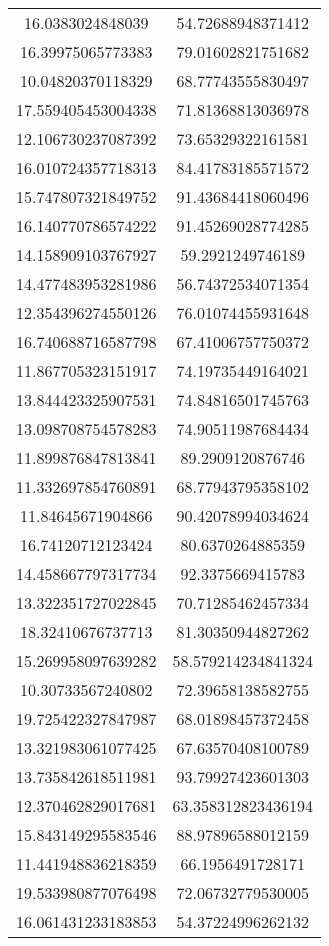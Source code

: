 \begin{table}
\begin{tabular}{cc}
16.0383024848039 & 54.72688948371412 \\
16.39975065773383 & 79.01602821751682 \\
10.04820370118329 & 68.77743555830497 \\
17.559405453004338 & 71.81368813036978 \\
12.106730237087392 & 73.65329322161581 \\
16.010724357718313 & 84.41783185571572 \\
15.747807321849752 & 91.43684418060496 \\
16.140770786574222 & 91.45269028774285 \\
14.158909103767927 & 59.2921249746189 \\
14.477483953281986 & 56.74372534071354 \\
12.354396274550126 & 76.01074455931648 \\
16.740688716587798 & 67.41006757750372 \\
11.867705323151917 & 74.19735449164021 \\
13.844423325907531 & 74.84816501745763 \\
13.098708754578283 & 74.90511987684434 \\
11.899876847813841 & 89.2909120876746 \\
11.332697854760891 & 68.77943795358102 \\
11.84645671904866 & 90.42078994034624 \\
16.74120712123424 & 80.6370264885359 \\
14.458667797317734 & 92.3375669415783 \\
13.322351727022845 & 70.71285462457334 \\
18.32410676737713 & 81.30350944827262 \\
15.269958097639282 & 58.579214234841324 \\
10.30733567240802 & 72.39658138582755 \\
19.725422327847987 & 68.01898457372458 \\
13.321983061077425 & 67.63570408100789 \\
13.735842618511981 & 93.79927423601303 \\
12.370462829017681 & 63.358312823436194 \\
15.843149295583546 & 88.97896588012159 \\
11.441948836218359 & 66.1956491728171 \\
19.533980877076498 & 72.06732779530005 \\
16.061431233183853 & 54.37224996262132 \\

\end{tabular}
\end{table}
